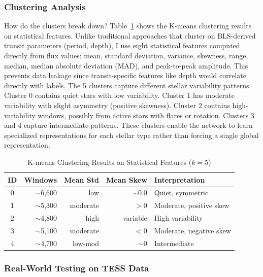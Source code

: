 \documentclass[letterpaper]{article} %
\begin{document}
\subsubsection{Clustering Analysis}
How do the clusters break down? Table~\ref{tab:bilstm_clusters} shows the K-means clustering results on statistical features. Unlike traditional approaches that cluster on BLS-derived transit parameters (period, depth), I use eight statistical features computed directly from flux values: mean, standard deviation, variance, skewness, range, median, median absolute deviation (MAD), and peak-to-peak amplitude. This prevents data leakage since transit-specific features like depth would correlate directly with labels. The 5 clusters capture different stellar variability patterns. Cluster 0 contains quiet stars with low variability. Cluster 1 has moderate variability with slight asymmetry (positive skewness). Cluster 2 contains high-variability windows, possibly from active stars with flares or rotation. Clusters 3 and 4 capture intermediate patterns. These clusters enable the network to learn specialized representations for each stellar type rather than forcing a single global representation.

\begin{table}[h]
    \centering
    \caption{K-means Clustering Results on Statistical Features ($k=5$)}
    \label{tab:bilstm_clusters}
    \begin{tabular}{@{}crrrp{2.5cm}@{}}
        \toprule
        \textbf{ID} & \textbf{Windows} & \textbf{Mean Std} & \textbf{Mean Skew} & \textbf{Interpretation} \\
        \midrule
            0 & $\sim$6,600 & low & $\sim$0.0 & Quiet, symmetric \\
            1 & $\sim$5,300 & moderate & $>$0 & Moderate, positive skew \\
            2 & $\sim$4,800 & high & variable & High variability \\
            3 & $\sim$5,100 & moderate & $<$0 & Moderate, negative skew \\
            4 & $\sim$4,700 & low-mod & $\sim$0 & Intermediate \\
        \bottomrule
    \end{tabular}
\end{table}

\subsubsection{Real-World Testing on TESS Data}
\end{document}
